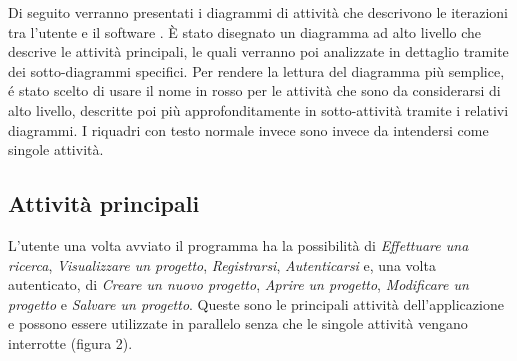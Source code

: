Di seguito verranno presentati i diagrammi di attività che descrivono le iterazioni tra l'utente e il software \PROGETTO.
È stato disegnato un diagramma ad alto livello che descrive le attività principali, le quali verranno poi analizzate in dettaglio tramite dei sotto-diagrammi specifici. Per rendere la lettura del diagramma più semplice, é stato scelto di usare il nome in rosso per le attività che sono da considerarsi di alto livello, descritte poi più approfonditamente in sotto-attività tramite i relativi diagrammi. I riquadri con testo normale invece sono invece da intendersi come singole attività.

\subsection{Attività principali}
L'utente una volta avviato il programma ha la possibilità di \textit{Effettuare una ricerca}, \textit{Visualizzare un progetto}, \textit{Registrarsi}, \textit{Autenticarsi} e, una volta autenticato, di \textit{Creare un nuovo progetto}, \textit{Aprire un progetto}, \textit{Modificare un progetto} e \textit{Salvare un progetto}. Queste sono le principali attività dell'applicazione e possono essere utilizzate in parallelo senza che le singole attività vengano interrotte (figura 2).

